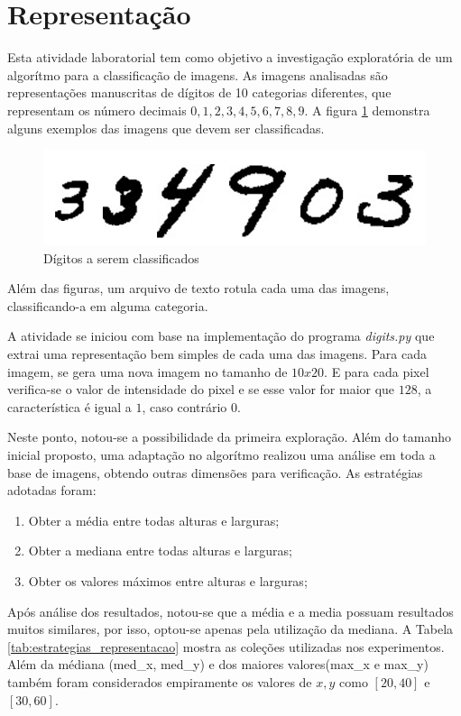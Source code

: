 \documentclass[9pt,twocolumn]{article}
\begin{document}
\section{Representação}

Esta atividade laboratorial tem como objetivo a investigação exploratória de um algorítmo para a classificação de imagens. As imagens analisadas são representações manuscritas de dígitos de 10 categorias diferentes, que representam os número decimais $0,1,2,3,4,5,6,7,8,9$. A figura \ref{fig:image_1_digits} demonstra alguns exemplos das imagens que devem ser classificadas.

\begin{figure}[!htb]
  \includegraphics[width=\linewidth]{images/image_1_digits.jpg}
  \caption{Dígitos a serem classificados}
  \label{fig:image_1_digits}
\end{figure}

Além das figuras, um arquivo de texto rotula cada uma das imagens, classificando-a em alguma categoria.

A atividade se iniciou com base na implementação do programa \textit{digits.py} que extrai uma representação bem simples de cada uma das imagens. Para cada imagem, se gera uma nova imagem no tamanho de $10 x 20$. E para cada pixel verifica-se o valor de intensidade do pixel e se esse valor for maior que $128$, a característica é igual a $1$, caso contrário $0$.

Neste ponto, notou-se a possibilidade da primeira exploração. Além do tamanho inicial proposto, uma adaptação no algorítmo realizou uma análise em toda a base de imagens, obtendo outras dimensões para verificação. As estratégias adotadas foram:

\begin{enumerate}
  \item Obter a média entre todas alturas e larguras;
  \item Obter a mediana entre todas alturas e larguras;
  \item Obter os valores máximos entre alturas e larguras;
\end{enumerate}

Após análise dos resultados, notou-se que a média e a media possuam resultados muitos similares, por isso, optou-se apenas pela utilização da mediana. A Tabela \ref{tab:estrategias_representacao} mostra as coleções utilizadas nos experimentos. Além da médiana (med\_x, med\_y) e dos maiores valores(max\_x e max\_y) também foram considerados empiramente os valores de $x,y$ como $[20,40]$ e $[30,60]$.
\end{document}
